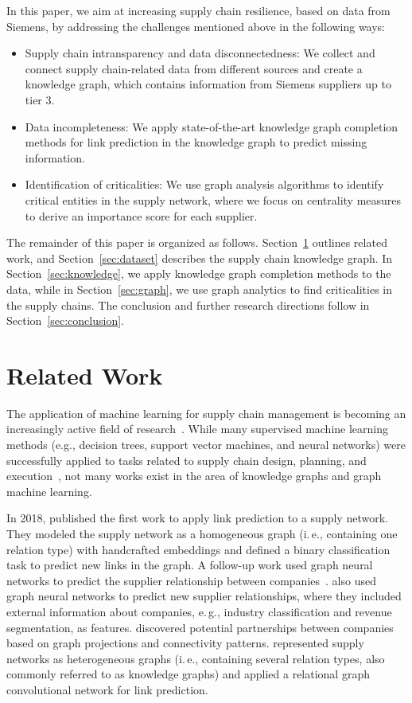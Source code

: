 \documentclass[
]{ceurart}
\begin{document}
In this paper, we aim at increasing supply chain resilience, based on data from Siemens, by addressing the challenges mentioned above in the following ways:
\begin{itemize}
\item Supply chain intransparency and data disconnectedness: We collect and connect supply chain-related data from different sources and create a knowledge graph, which contains information from Siemens suppliers up to tier 3. 
\item Data incompleteness: We apply state-of-the-art knowledge graph completion methods for link prediction in the knowledge graph to predict missing information.
\item Identification of criticalities: We use graph analysis algorithms to identify critical entities in the supply network, where we focus on centrality measures to derive an importance score for each supplier.
\end{itemize}

The remainder of this paper is organized as follows. Section~\ref{sec:related} outlines related work, and Section~\ref{sec:dataset} describes the supply chain knowledge graph. In Section~\ref{sec:knowledge}, we apply knowledge graph completion methods to the data, while in Section~\ref{sec:graph}, we use graph analytics to find criticalities in the supply chains. The conclusion and further research directions follow in Section~\ref{sec:conclusion}.

\section{Related Work}
\label{sec:related}
The application of machine learning for supply chain management is becoming an increasingly active field of research~\cite{brylowski2021review}. While many supervised machine learning methods (e.g., decision trees, support vector machines, and neural networks) were successfully applied to tasks related to supply chain design, planning, and execution~\cite{brylowski2021review, tirkolaee2021}, not many works exist in the area of knowledge graphs and graph machine learning. 

In 2018, \citet{brintrup2018} published the first work to apply link prediction to a supply network. They modeled the supply network as a homogeneous graph (i.\,e., containing one relation type) with handcrafted embeddings and defined a binary classification task to predict new links in the graph. A follow-up work used graph neural networks to predict the supplier relationship between companies~\cite{kosasih2021}. 
\citet{gopal2021} also used graph neural networks to predict new supplier relationships, where they included external information about companies, e.\,g., industry classification and revenue segmentation, as features. \citet{lu2020} discovered potential partnerships between companies based on graph projections and connectivity patterns. \citet{aziz2021} represented supply networks as heterogeneous graphs (i.\,e., containing several relation types, also commonly referred to as knowledge graphs) and applied a relational graph convolutional network for link prediction. 
\end{document}
